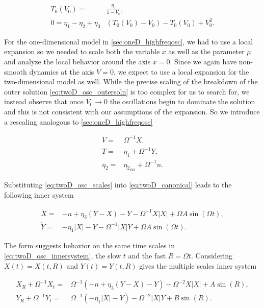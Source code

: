 \begin{equation*} \label{eq:twoD_lowerleadingorder}
\begin{aligned}
T_0(V_0)=&\frac{\eta_1}{1-V_0},\\
0=\eta_1-\eta_2+\eta_3&(T_0(V_0)-V_0)-T_0(V_0)+V_0^2.
\end{aligned}
\end{equation*}

For the one-dimensional model in \autoref{sec:oneD_highfreqosc}, we had to use a local expansion so we needed to scale both the variable $x$ as well as the parameter $\mu$ and analyze the local behavior around the axis $x=0$. Since we again have non-smooth dynamics at the axis $V=0$, we expect to use a local expansion for the two-dimensional model as well. While the precise scaling of the breakdown of the outer solution \eqref{eq:twoD_osc_outersoln} is too complex for us to search for, we instead observe that once $V_0\to0$ the oscillations begin to dominate the solution and this is not consistent with our assumptions of the expansion. So we introduce a rescaling analogous to \autoref{sec:oneD_highfreqosc}

\begin{equation}\label{eq:twoD_osc_scales}
\begin{aligned}
V=&\Omega^{-1}X,\\
T=& \eta_1 +\Omega^{-1}Y,\\
\eta_2=&{\eta_2}_{ns}+\Omega^{-1} n.
\end{aligned}
\end{equation}

Substituting \eqref{eq:twoD_osc_scales} into \eqref{eq:twoD_canonical} leads to the following inner system

\begin{equation}\label{eq:twoD_osc_innersystem}
\begin{aligned}
\dot{X}=& -n+\eta_3(Y-X)-Y-\Omega^{-1}X|X| +\Omega A\sin(\Omega t),\\
\dot{Y}=& -\eta_1|X|-Y -\Omega^{-1}|X|Y +\Omega A \sin(\Omega t).
\end{aligned}
\end{equation}

The form suggests behavior on the same time scales in \eqref{eq:twoD_osc_innersystem}, the slow $t$ and the fast $R=\Omega t$. Considering $X(t)=X(t,R)$ and $Y(t)=Y(t,R)$ gives the multiple scales inner system

\begin{equation}\label{eq:twoD_osc_innermulti}
\begin{aligned}
X_R+\Omega^{-1}X_t =& \Omega^{-1}\left(-n +\eta_3(Y-X)-Y\right)-\Omega^{-2}X|X|+A\sin(R),\\
Y_R+\Omega^{-1}Y_t =& \Omega^{-1}\left(-\eta_1|X|-Y\right)-\Omega^{-2}|X|Y+ B\sin(R).
\end{aligned}
\end{equation}

